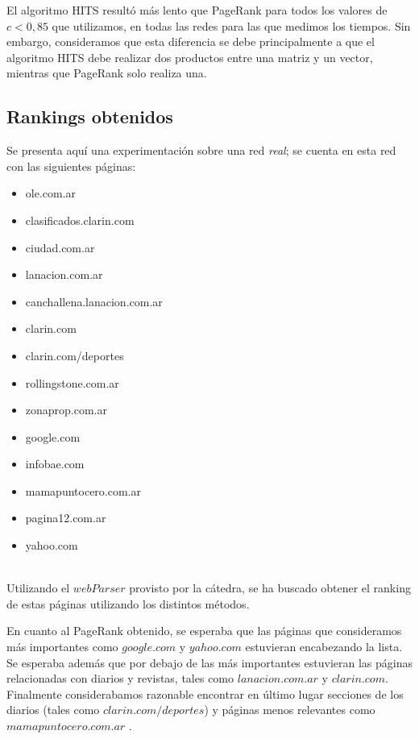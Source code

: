 \documentclass[a4paper]{article}
\begin{document}
El algoritmo HITS resultó más lento que PageRank para todos los valores de $c < 0,85$ que utilizamos, en todas las redes para las que medimos los tiempos. Sin embargo, consideramos que esta diferencia se debe principalmente a que el algoritmo HITS debe realizar dos productos entre una matriz y un vector, mientras que PageRank solo realiza una.\\

\newpage
\subsection{Rankings obtenidos}

Se presenta aquí una experimentación sobre una red \textit{real}; se cuenta en esta red con las siguientes páginas:\\

\begin{itemize}
\item ole.com.ar
\item clasificados.clarin.com
\item ciudad.com.ar
\item lanacion.com.ar
\item canchallena.lanacion.com.ar
\item clarin.com
\item clarin.com/deportes
\item rollingstone.com.ar
\item zonaprop.com.ar
\item google.com
\item infobae.com
\item mamapuntocero.com.ar
\item pagina12.com.ar
\item yahoo.com \\ \\
\end{itemize}

Utilizando el $webParser$ provisto por la cátedra, se ha buscado obtener el ranking de estas páginas utilizando los distintos métodos.

En cuanto al PageRank obtenido, se esperaba que las páginas que consideramos más importantes como $google.com$ y $yahoo.com$ estuvieran encabezando la lista. Se esperaba además que por debajo de las más importantes estuvieran las páginas relacionadas con diarios y revistas, tales como $lanacion.com.ar$ y $clarin.com$. Finalmente considerabamos razonable encontrar en último lugar secciones de los diarios (tales como $clarin.com/deportes$) y páginas menos relevantes como $mamapuntocero.com.ar$ .\\
\end{document}
